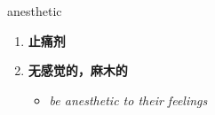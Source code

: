 
\begin{frame}
{\huge anesthetic}
\begin{center}
\begin{enumerate}\Large
  \item \textbf{止痛剂}
  \item \textbf{无感觉的，麻木的}
  \begin{itemize}
    \item \em{\Large{be anesthetic to their feelings}}
  \end{itemize}
\end{enumerate}
\end{center}
\end{frame}
